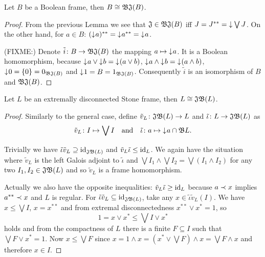 \begin{proposition}
    Let $B$ be a Boolean frame, then $B \cong \mathfrak{B}\mathfrak{J}(B)$.
\end{proposition}
\begin{proof}
    From the previous Lemma we see that $\mathfrak{J} \in \mathfrak{B}\mathfrak{J}(B)$ iff $J = J^{**} = \mathord{\downarrow}\mkern1mu \bigvee J$. On the other hand, for $a \in B$: $(\mathord{\downarrow}\mkern1mu a)^{**} = \mathord{\downarrow}\mkern1mu a^{**} = \mathord{\downarrow}\mkern1mu a$.

    (FIXME:) Denote $\tilde i\colon B \to \mathfrak{B}\mathfrak{J}(B)$ the mapping $a \mapsto \mathord{\downarrow}\mkern1mu a$. It is a Boolean homomorphism, because $\mathord{\downarrow}\mkern1mu a \vee \mathord{\downarrow}\mkern1mu b = \mathord{\downarrow}\mkern1mu (a \vee b)$, $\mathord{\downarrow}\mkern1mu a \wedge \mathord{\downarrow}\mkern1mu b = \mathord{\downarrow}\mkern1mu (a \wedge b)$, $\mathord{\downarrow}\mkern1mu 0 = \{0\} = 0_{\mathfrak{B}\mathfrak{J}(B)}$ and $\mathord{\downarrow}\mkern1mu 1 = B = 1_{\mathfrak{B}\mathfrak{J}(B)}$. Consequently $\tilde i$ is an isomorphism of $B$ and $\mathfrak{B}\mathfrak{J}(B)$.
\end{proof}

\begin{proposition}
    Let $L$ be an extremally disconnected Stone frame, then $L \cong \mathfrak{J}\mathfrak{B}(L)$.
\end{proposition}
\begin{proof}
    Similarly to the general case, define $\tilde v_L\colon \mathfrak{J}\mathfrak{B}(L) \to L$ and $\tilde\iota\colon L \to \mathfrak{J}\mathfrak{B}(L)$ as
    $$  \tilde v_L\colon I \mapsto \bigvee I \quad\text{and}\quad \tilde\iota\colon a \mapsto \mathord{\downarrow}\mkern1mu a \cap \mathfrak{B} L.$$

    Trivially we have $\tilde\iota \tilde v_L \supseteq \operatorname{id}_{\mathfrak{J}\mathfrak{B}(L)}$ and $\tilde v_L \tilde\iota \leq \operatorname{id}_L$. We again have the situation where $\tilde v_L$ is the left Galois adjoint to $\tilde\iota$ and $\bigvee I_1 \wedge \bigvee I_2 = \bigvee (I_1 \wedge I_2)$ for any two $I_1, I_2 \in \mathfrak{J}\mathfrak{B}(L)$ and so $\tilde v_L$ is a frame homomorphism.

    Actually we also have the opposite inequalities: $\tilde v_L \tilde\iota \geq \operatorname{id}_L$ because $a \prec x$ implies $a^{**} \prec x$ and $L$ is regular. For $\tilde\iota \tilde v_L \subseteq \operatorname{id}_{\mathfrak{J}\mathfrak{B}(L)}$, take any $x \in \tilde\iota \tilde v_L(I)$. We have $x \leq \bigvee I$, $x = x^{**}$ and from extremal disconnectedness $x^{**} \vee x^* = 1$, so
    $$ 1 = x \vee x^* \leq \bigvee I \vee x^*$$
    \noindent holds and from the compactness of $L$ there is a finite $F \subseteq I$ such that $\bigvee F \vee x^* = 1$. Now $x \leq \bigvee F$ since $x = 1 \wedge x = (x^* \vee \bigvee F) \wedge x = \bigvee F \wedge x$ and therefore $x \in I$.
\end{proof}

